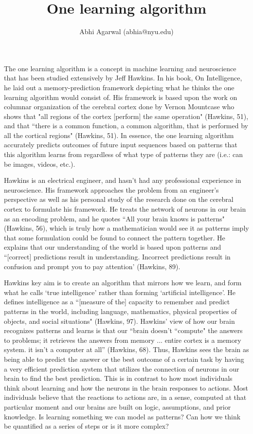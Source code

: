 \documentclass[11pt, oneside]{article}
\title{One learning algorithm}
\author{Abhi Agarwal (abhia@nyu.edu)}
\date{}
\begin{document}
\maketitle

\par The one learning algorithm is a concept in machine learning and neuroscience that has been studied extensively by Jeff Hawkins. In his book, On Intelligence, he laid out a memory-prediction framework depicting what he thinks the one learning algorithm would consist of. His framework is based upon the work on columnar organization of the cerebral cortex done by Vernon Mountcase who shows that "all regions of the cortex [perform] the same operation" (Hawkins, 51), and that ``there is a common function, a common algorithm, that is performed by all the cortical regions" (Hawkins, 51). In essence, the one learning algorithm accurately predicts outcomes of future input sequences based on patterns that this algorithm learns from regardless of what type of patterns they are (i.e.: can be images, videos, etc.).

\par Hawkins is an electrical engineer, and hasn't had any professional experience in neuroscience. His framework approaches the problem from an engineer's perspective as well as his personal study of the research done on the cerebral cortex to formulate his framework. He treats the network of neurons in our brain as an encoding problem, and he quotes ``All your brain knows is patterns" (Hawkins, 56), which is truly how a mathematician would see it as patterns imply that some formulation could be found to connect the pattern together. He explains that our understanding of the world is based upon patterns and ``[correct] predictions result in understanding. Incorrect predictions result in confusion and prompt you to pay attention' (Hawkins, 89). 

\par Hawkins key aim is to create an algorithm that mirrors how we learn, and form what he calls `true intelligence' rather than forming `artificial intelligence'. He defines intelligence as a ``[measure of the] capacity to remember and predict patterns in the world, including language, mathematics, physical properties of objects, and social situations" (Hawkins, 97). Hawkins' view of how our brain recognizes patterns and learns is that our ``brain doesn't ``compute" the answers to problems; it retrieves the answers from memory ... entire cortex is a memory system. it isn't a computer at all'' (Hawkins, 68). Thus, Hawkins sees the brain as being able to predict the answer or the best outcome of a certain task by having a very efficient prediction system that utilizes the connection of neurons in our brain to find the best prediction. This is in contrast to how most individuals think about learning and how the neurons in the brain responses to actions. Most individuals believe that the reactions to actions are, in a sense, computed at that particular moment and our brains are built on logic, assumptions, and prior knowledge. Is learning something we can model as patterns? Can how we think be quantified as a series of steps or is it more complex?
\end{document}
